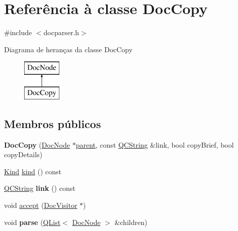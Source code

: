 \hypertarget{class_doc_copy}{\section{Referência à classe Doc\-Copy}
\label{class_doc_copy}
}


{\ttfamily \#include $<$docparser.\-h$>$}

Diagrama de heranças da classe Doc\-Copy\begin{figure}[H]
\begin{center}
\leavevmode
\includegraphics[height=2.000000cm]{class_doc_copy}
\end{center}
\end{figure}
\subsection*{Membros públicos}
\begin{DoxyCompactItemize}
\item 
\hypertarget{class_doc_copy_aea6ea18979e9ae698cdcba819ffc8c29}{{\bfseries Doc\-Copy} (\hyperlink{class_doc_node}{Doc\-Node} $\ast$\hyperlink{class_doc_node_abd7f070d6b0a38b4da71c2806578d19d}{parent}, const \hyperlink{class_q_c_string}{Q\-C\-String} \&link, bool copy\-Brief, bool copy\-Details)}\label{class_doc_copy_aea6ea18979e9ae698cdcba819ffc8c29}

\item 
\hyperlink{class_doc_node_aa10c9e8951b8ccf714a59ec321bdac5b}{Kind} \hyperlink{class_doc_copy_aa9d037bed9f9a083d0cd01485637d843}{kind} () const 
\item 
\hypertarget{class_doc_copy_a0dadd403bf834d1f682439809db48075}{\hyperlink{class_q_c_string}{Q\-C\-String} {\bfseries link} () const }\label{class_doc_copy_a0dadd403bf834d1f682439809db48075}

\item 
void \hyperlink{class_doc_copy_af347f2f0efd50d074840dce223fdf2a8}{accept} (\hyperlink{class_doc_visitor}{Doc\-Visitor} $\ast$)
\item 
\hypertarget{class_doc_copy_a705ebd54b4beac967c2a71c6c708daff}{void {\bfseries parse} (\hyperlink{class_q_list}{Q\-List}$<$ \hyperlink{class_doc_node}{Doc\-Node} $>$ \&children)}\label{class_doc_copy_a705ebd54b4beac967c2a71c6c708daff}

\end{DoxyCompactItemize}
